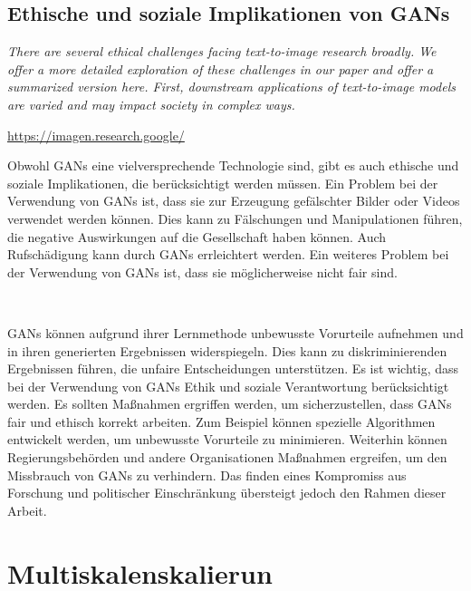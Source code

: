     \subsection{Ethische und soziale Implikationen von GANs}

    \begin{center}
        \textit{There are several ethical challenges facing text-to-image research broadly. We offer a more detailed exploration of these challenges in our paper and offer a summarized version here. First, downstream applications of text-to-image models are varied and may impact society in complex ways.}

        \url{https://imagen.research.google/}
    \end{center}
    
        Obwohl GANs eine vielversprechende Technologie sind, gibt es auch ethische und soziale Implikationen, die berücksichtigt werden müssen.      
        Ein Problem bei der Verwendung von GANs ist, dass sie zur Erzeugung gefälschter Bilder oder Videos verwendet werden können.      
        Dies kann zu Fälschungen und Manipulationen führen, die negative Auswirkungen auf die Gesellschaft haben können.
        Auch Rufschädigung kann durch GANs errleichtert werden.
        Ein weiteres Problem bei der Verwendung von GANs ist, dass sie möglicherweise nicht fair sind.  

        ~

        GANs können aufgrund ihrer Lernmethode unbewusste Vorurteile aufnehmen und in ihren generierten Ergebnissen widerspiegeln.      
        Dies kann zu diskriminierenden Ergebnissen führen, die unfaire Entscheidungen unterstützen.
        Es ist wichtig, dass bei der Verwendung von GANs Ethik und soziale Verantwortung berücksichtigt werden.      
        Es sollten Maßnahmen ergriffen werden, um sicherzustellen, dass GANs fair und ethisch korrekt arbeiten.      
        Zum Beispiel können spezielle Algorithmen entwickelt werden, um unbewusste Vorurteile zu minimieren.      
        Weiterhin können Regierungsbehörden und andere Organisationen Maßnahmen ergreifen, um den Missbrauch von GANs zu verhindern.   
        Das finden eines Kompromiss aus Forschung und politischer Einschränkung übersteigt jedoch den Rahmen dieser Arbeit.      
    
\section{Multiskalenskalierun}

